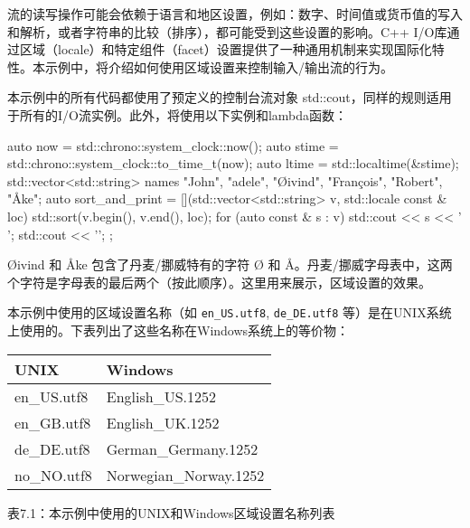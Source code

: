 
流的读写操作可能会依赖于语言和地区设置，例如：数字、时间值或货币值的写入和解析，或者字符串的比较（排序），都可能受到这些设置的影响。C++ I/O库通过区域（locale）和特定组件（facet）设置提供了一种通用机制来实现国际化特性。本示例中，将介绍如何使用区域设置来控制输入/输出流的行为。


本示例中的所有代码都使用了预定义的控制台流对象 std::cout，同样的规则适用于所有的I/O流实例。此外，将使用以下实例和lambda函数：

\begin{cpp}
auto now = std::chrono::system_clock::now();
auto stime = std::chrono::system_clock::to_time_t(now);
auto ltime = std::localtime(&stime);
std::vector<std::string> names
{"John", "adele", "Øivind", "François", "Robert", "Åke"};
auto sort_and_print = [](std::vector<std::string> v,
                         std::locale const & loc)
{
    std::sort(v.begin(), v.end(), loc);
    for (auto const & s : v) std::cout << s << ' ';
    std::cout << '\n';
};

\end{cpp}

Øivind 和 Åke 包含了丹麦/挪威特有的字符 Ø 和 Å。丹麦/挪威字母表中，这两个字符是字母表的最后两个（按此顺序）。这里用来展示，区域设置的效果。

本示例中使用的区域设置名称（如 \verb|en_US.utf8|, \verb|de_DE.utf8| 等）是在UNIX系统上使用的。下表列出了这些名称在Windows系统上的等价物：

\begin{longtable}{|l|l|}
\hline
\textbf{UNIX} & \textbf{Windows}       \\ \hline
\endfirsthead
%
\endhead
%
en\_US.utf8   & English\_US.1252       \\ \hline
en\_GB.utf8   & English\_UK.1252       \\ \hline
de\_DE.utf8   & German\_Germany.1252   \\ \hline
no\_NO.utf8   & Norwegian\_Norway.1252 \\ \hline
\end{longtable}

\begin{center}
表7.1：本示例中使用的UNIX和Windows区域设置名称列表
\end{center}

